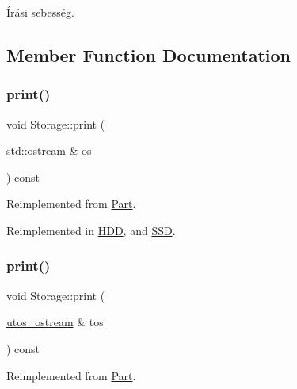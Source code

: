 Írási sebesség. 



\subsection{Member Function Documentation}
\mbox{\label{class_storage_aa9f6ffb0fd45839b54bd4e254270445d}} 
\subsubsection{\texorpdfstring{print()}{print()}\hspace{0.1cm}{\footnotesize\ttfamily [1/2]}}
{\footnotesize\ttfamily void Storage\+::print (\begin{DoxyParamCaption}\item[{std\+::ostream \&}]{os }\end{DoxyParamCaption}) const\hspace{0.3cm}{\ttfamily [virtual]}}



Reimplemented from \mbox{\hyperlink{class_part_a4fa402b8e8fd4236ff773a7697ab2bc3}{Part}}.



Reimplemented in \mbox{\hyperlink{class_h_d_d_a07c34356018542934a4dd91ce38b0821}{H\+DD}}, and \mbox{\hyperlink{class_s_s_d_a3c07aa0fd7bb547cfb4a775513e427a9}{S\+SD}}.

\mbox{\label{class_storage_ab7ecf9e0777891b4e1a84bbf391a1cd4}} 
\subsubsection{\texorpdfstring{print()}{print()}\hspace{0.1cm}{\footnotesize\ttfamily [2/2]}}
{\footnotesize\ttfamily void Storage\+::print (\begin{DoxyParamCaption}\item[{\mbox{\hyperlink{structutos__ostream}{utos\+\_\+ostream}} \&}]{tos }\end{DoxyParamCaption}) const\hspace{0.3cm}{\ttfamily [virtual]}}



Reimplemented from \mbox{\hyperlink{class_part_a9ecabe44ba3415badf82c6a23617a41e}{Part}}.



